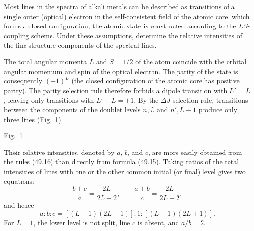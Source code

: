 \ProblemHeading
Most lines in the spectra of alkali metals can be described as transitions of a single outer (optical) electron in the self-consistent field of the atomic core, which forms a closed configuration; the atomic state is constructed according to the $LS$-coupling scheme. Under these assumptions, determine the relative intensities of the fine-structure components of the spectral lines.

\SolutionHeading The total angular momenta $L$ and $S=1/2$ of the atom coincide with the orbital angular momentum and spin of the optical electron. The parity of the state is consequently $(-1)^L$ (the closed configuration of the atomic core has positive parity). The parity selection rule therefore forbids a dipole transition with $L'=L$, leaving only transitions with $L'-L=\pm1$. By the $\Delta J$ selection rule, transitions between the components of the doublet levels $n,L$ and $n',L-1$ produce only three lines (Fig.~1).

\begin{center}

Fig.~1
\end{center}

Their relative intensities, denoted by $a$, $b$, and $c$, are more easily obtained from the rules (49.16) than directly from formula (49.15). Taking ratios of the total intensities of lines with one or the other common initial (or final) level gives two equations:
\[
\frac{b+c}{a}=\frac{2L}{2L+2},
\qquad
\frac{a+b}{c}=\frac{2L}{2L-2},
\]
and hence
\[
a:b:c=[(L+1)(2L-1)]:1:[(L-1)(2L+1)].
\]
For $L=1$, the lower level is not split, line $c$ is absent, and $a/b=2$.
